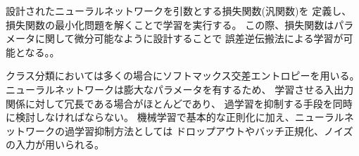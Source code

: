 設計されたニューラルネットワークを引数とする損失関数(汎関数)を
定義し、損失関数の最小化問題を解くことで学習を実行する。
この際、損失関数はパラメータに関して微分可能なように設計することで
誤差逆伝搬法による学習が可能となる。。

クラス分類においては多くの場合にソフトマックス交差エントロピーを用いる。
ニューラルネットワークは膨大なパラメータを有するため、
学習させる入出力関係に対して冗長である場合がほとんどであり、
過学習を抑制する手段を同時に検討しなければならない。
機械学習で基本的な正則化に加え、ニューラルネットワークの過学習抑制方法としては
ドロップアウトやバッチ正規化、ノイズの入力が用いられる。



